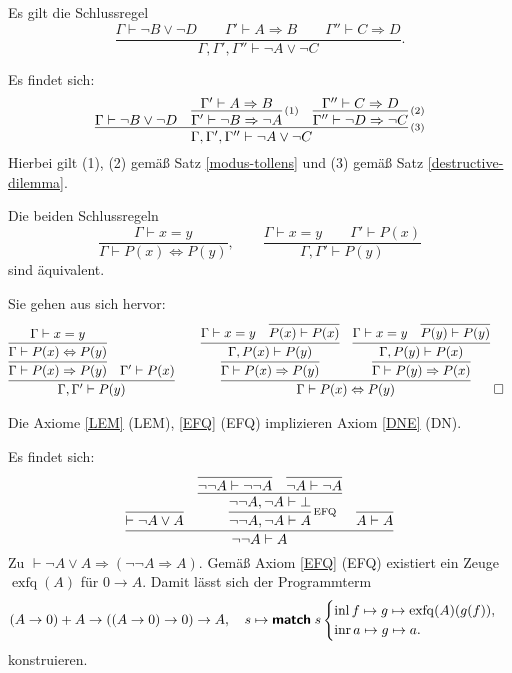 \begin{Satz}
Es gilt die Schlussregel
\[\dfrac{\Gamma\vdash \neg B\lor \neg D\qquad
\Gamma'\vdash A\Rightarrow B\qquad\Gamma''\vdash C\Rightarrow D}{
\Gamma,\Gamma',\Gamma''\vdash \neg A\lor \neg C}.\]
\end{Satz}
\begin{Beweis}
Es findet sich:
\[
\infer[\infernote{(3)}]{\Gamma,\Gamma',\Gamma''\vdash \neg A\lor \neg C}{
  \Gamma\vdash \neg B\lor \neg D
  & \infer[\infernote{(1)}]{\Gamma'\vdash\neg B\Rightarrow\neg A}{
      \Gamma'\vdash A\Rightarrow B}
  & \infer[\infernote{(2)}]{\Gamma''\vdash\neg D\Rightarrow\neg C}{
      \Gamma''\vdash C\Rightarrow D}}
\]
Hierbei gilt (1), (2) gemäß Satz \ref{modus-tollens} und (3) gemäß Satz
\ref{destructive-dilemma}.\,\qedsymbol
\end{Beweis}

\begin{Satz} Die beiden Schlussregeln
\[\dfrac{\Gamma\vdash x=y}{\Gamma\vdash P(x)\Leftrightarrow P(y)},\qquad
\dfrac{\Gamma\vdash x=y\qquad\Gamma'\vdash P(x)}{\Gamma,\Gamma'\vdash P(y)}\]
sind äquivalent.
\end{Satz}
\begin{Beweis}
Sie gehen aus sich hervor:
\[
\begin{array}{@{}l@{\qquad}l}
\infer{\Gamma,\Gamma'\vdash P(y)}{
  \infer{\Gamma\vdash P(x)\Rightarrow P(y)}{
    \infer{\Gamma\vdash P(x)\Leftrightarrow P(y)}{\Gamma\vdash x=y}}
& \Gamma'\vdash P(x)}
&
\infer{\Gamma\vdash P(x)\Leftrightarrow P(y)}{
  \infer{\Gamma\vdash P(x)\Rightarrow P(y)}{
    \infer{\Gamma, P(x)\vdash P(y)}{
      \Gamma\vdash x=y & \infer{P(x)\vdash P(x)}{}}}
& \infer{\Gamma\vdash P(y)\Rightarrow P(x)}{
    \infer{\Gamma,P(y)\vdash P(x)}{
      \Gamma\vdash x=y & \infer{P(y)\vdash P(y)}{}}}}\;\qedsymbol
\end{array}
\]
\end{Beweis}

\begin{Satz} Die Axiome \ref{LEM} (LEM), \ref{EFQ} (EFQ)
implizieren Axiom \ref{DNE} (DN).
\end{Satz}
\begin{Beweis} Es findet sich:
\[
\infer{\neg\neg A\vdash A}{
  \infer{\vdash\neg A\lor A}{}
& \infer[\infernote{EFQ}]{\neg\neg A,\neg A\vdash A}{
    \infer{\neg\neg A,\neg A\vdash\bot}{
      \infer{\neg\neg A\vdash\neg\neg A}{}
    & \infer{\neg A\vdash\neg A}{}}}
& \infer{A\vdash A}{}}
\]
Zu $\vdash \neg A \lor A\Rightarrow (\neg\neg A \Rightarrow A)$.
Gemäß Axiom \ref{EFQ} (EFQ) existiert ein Zeuge $\operatorname{exfq}(A)$
für $0\to A$. Damit lässt sich der Programmterm
\[(A\to 0) + A \to ((A\to 0)\to 0)\to A,\quad
s\mapsto\text{{\normalfont\sffamily\bfseries match}}\; s\begin{cases}
\operatorname{inl} f\mapsto g\mapsto \operatorname{exfq}(A)(g(f)),\\
\operatorname{inr} a\mapsto g\mapsto a.
\end{cases}\]
konstruieren.\;\qedsymbol
\end{Beweis}

